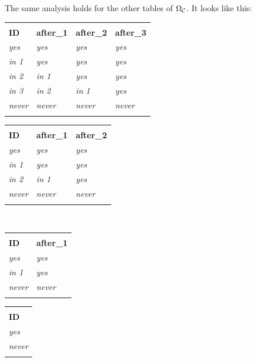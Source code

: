 \documentclass[CT4S-EN-RU]{subfiles}
\begin{document}
\begin{exampleENG}
The same analysis holds for the other tables of $\Omega_\mathcal{C}$. It looks like this:
\begin{center}
\begin{tabular}{| l || l | l | l |}
\bhline
\multicolumn{4}{|c|}{$\Omega_\mcC({\tt 0})$}\\\bhline
{\bf ID}&{\bf after\_1}&{\bf after\_2}&{\bf after\_3}\\\bbhline
{\it yes}&{\it yes}&{\it yes}&{\it yes}\\\hline
{\it in 1}&{\it yes}&{\it yes}&{\it yes}\\\hline
{\it in 2}&{\it in 1}&{\it yes}&{\it yes}\\\hline
{\it in 3}&{\it in 2}&{\it in 1}&{\it yes}\\\hline
{\it never}&{\it never}&{\it never}&{\it never}\\\bhline
\end{tabular}
\hsp
\begin{tabular}{| l || l | l |}
\bhline
\multicolumn{3}{|c|}{$\Omega_\mcC({\tt 1})$}\\\bhline
{\bf ID}&{\bf after\_1}&{\bf after\_2}\\\bbhline
{\it yes}&{\it yes}&{\it yes}\\\hline
{\it in 1}&{\it yes}&{\it yes}\\\hline
{\it in 2}&{\it in 1}&{\it yes}\\\hline
{\it never}&{\it never}&{\it never}\\\bhline
\end{tabular}\\\vspace{.2in}
\begin{tabular}{| l || l |}
\bhline
\multicolumn{2}{|c|}{$\Omega_\mcC({\tt 2})$}\\\bhline
{\bf ID}&{\bf after\_1}\\\bbhline
{\it yes}&{\it yes}\\\hline
{\it in 1}&{\it yes}\\\hline
{\it never}&{\it never}\\\bhline
\end{tabular}
\hsp
\begin{tabular}{| l ||}
\bhline
\multicolumn{1}{|c|}{$\Omega_\mcC({\tt 3})$}\\\bhline
{\bf ID}\\\bbhline
{\it yes}\\\hline
{\it never}\\\bhline
\end{tabular}


\end{center}
\end{exampleENG}
\end{document}
